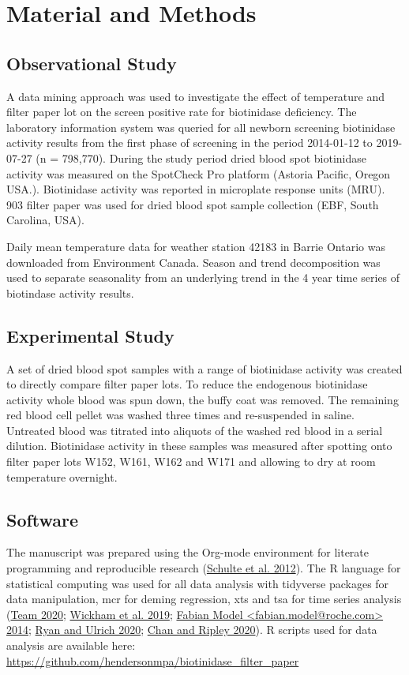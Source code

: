 \documentclass[review]{elsarticle}
\begin{document}
\section*{Material and Methods}
\label{sec:orga79b0ad}
\subsection*{Observational Study}
\label{sec:org389e492}
A data mining approach was used to investigate the effect of
temperature and filter paper lot on the screen positive rate for
biotinidase deficiency. The laboratory information system was queried
for all newborn screening biotinidase activity results from the first
phase of screening in the period 2014-01-12 to 2019-07-27 (n =
798,770). During the study period dried blood spot biotinidase
activity was measured on the SpotCheck Pro platform (Astoria Pacific,
Oregon USA.). Biotinidase activity was reported in microplate response
units (MRU). 903 filter paper was used for dried blood spot sample
collection (EBF, South Carolina, USA).

Daily mean temperature data for weather station 42183 in Barrie
Ontario was downloaded from Environment Canada. Season and trend
decomposition was used to separate seasonality from an underlying
trend in the 4 year time series of biotindase activity results.

\subsection*{Experimental Study}
\label{sec:org68387fb}

A set of dried blood spot samples with a range of biotinidase activity
was created to directly compare filter paper lots. To reduce the
endogenous biotinidase activity whole blood was spun down, the buffy
coat was removed. The remaining red blood cell pellet was washed three
times and re-suspended in saline. Untreated blood was titrated into
aliquots of the washed red blood in a serial dilution. Biotinidase
activity in these samples was measured after spotting onto filter
paper lots W152, W161, W162 and W171 and allowing to dry at room
temperature overnight.

\subsection*{Software}
\label{sec:org73a163d}
The manuscript was prepared using the Org-mode environment for
literate programming and reproducible research (\hyperlink{citeproc_bib_item_9}{Schulte et al. 2012}). The R language for statistical computing was used
for all data analysis with tidyverse packages for data manipulation,
mcr for deming regression, xts and tsa for time series analysis (\hyperlink{citeproc_bib_item_11}{Team 2020}; \hyperlink{citeproc_bib_item_14}{Wickham et al. 2019}; \hyperlink{citeproc_bib_item_4}{Fabian Model <fabian.model@roche.com> 2014}; \hyperlink{citeproc_bib_item_8}{Ryan and Ulrich 2020}; \hyperlink{citeproc_bib_item_3}{Chan and Ripley 2020}). R scripts used for data
analysis are available here:
\url{https://github.com/hendersonmpa/biotinidase\_filter\_paper}
\end{document}
